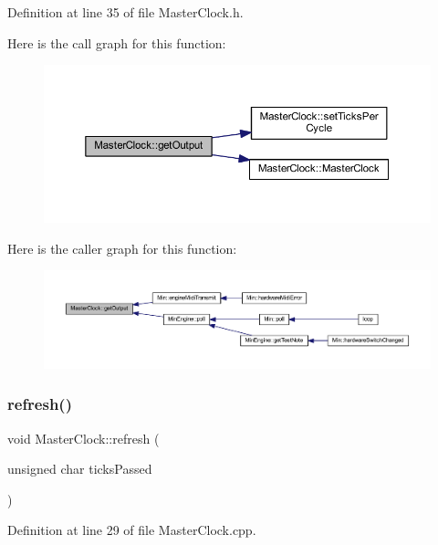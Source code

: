 Definition at line 35 of file Master\+Clock.\+h.

Here is the call graph for this function\+:
\nopagebreak
\begin{figure}[H]
\begin{center}
\leavevmode
\includegraphics[width=350pt]{class_master_clock_af63318129f4c13824614e73f549e5894_cgraph}
\end{center}
\end{figure}
Here is the caller graph for this function\+:
\nopagebreak
\begin{figure}[H]
\begin{center}
\leavevmode
\includegraphics[width=350pt]{class_master_clock_af63318129f4c13824614e73f549e5894_icgraph}
\end{center}
\end{figure}
\mbox{\label{class_master_clock_ae6c0b35db2932b94ec823eac80347707}} 
\subsubsection{\texorpdfstring{refresh()}{refresh()}}
{\footnotesize\ttfamily void Master\+Clock\+::refresh (\begin{DoxyParamCaption}\item[{unsigned char}]{ticks\+Passed }\end{DoxyParamCaption})}



Definition at line 29 of file Master\+Clock.\+cpp.

